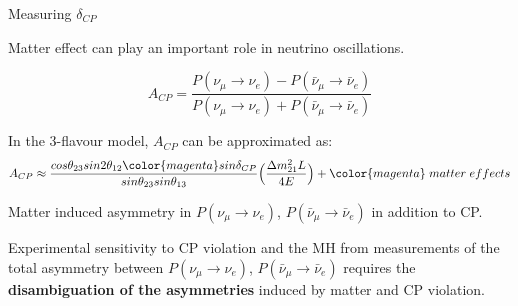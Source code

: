 %
%
\begin{frame}{Measuring $\delta_{CP}$}

Matter effect can play an important role in neutrino oscillations.

\begin{equation*}
   A_{CP} = \frac
     {P(\nu_{\mu} \rightarrow \nu_{e}) - P(\bar{\nu}_{\mu} \rightarrow \bar{\nu}_{e})}
     {P(\nu_{\mu} \rightarrow \nu_{e}) + P(\bar{\nu}_{\mu} \rightarrow \bar{\nu}_{e})}
\end{equation*}

In the 3-flavour model, $A_{CP}$ can be approximated as:
\begin{equation*}
   A_{CP} \approx \frac
    {cos\theta_{23} sin2\theta_{12} {\color{magenta} sin\delta_{CP}}}
    {sin\theta_{23} sin\theta_{13}}
    \Big( \frac{{\Delta}m^2_{21}L}{4E} \Big) +
    {\color{magenta} \; matter \; effects}
\end{equation*}

Matter induced asymmetry in
$P(\nu_{\mu} \rightarrow \nu_{e})$,
$P(\bar{\nu}_{\mu} \rightarrow \bar{\nu}_{e})$
in addition to CP.\\


\vspace{0.4cm}

Experimental sensitivity to CP violation and the MH from measurements
of the total asymmetry between
$P(\nu_{\mu} \rightarrow \nu_{e})$,
$P(\bar{\nu}_{\mu} \rightarrow \bar{\nu}_{e})$
requires the {\bf disambiguation of the asymmetries} induced by matter and CP
violation.

\end{frame}


